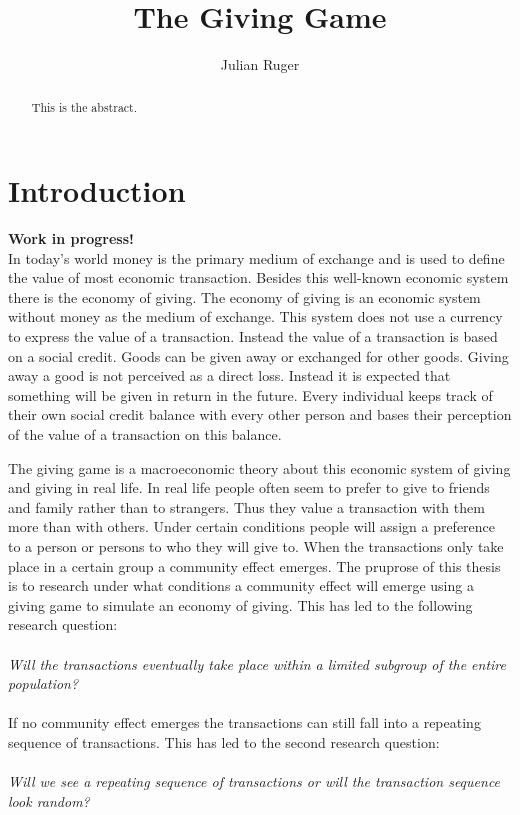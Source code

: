 \documentclass[twoside,openright]{uva-bachelor-thesis}
\title{The Giving Game}
\author{Julian Ruger}
\begin{document}
\maketitle

\begin{abstract}
This is the abstract. 
\end{abstract}

\tableofcontents

\chapter{Introduction}
\textbf{Work in progress!}
\\
In today's world money is the primary medium of exchange and is used to define the value of most economic transaction. Besides this well-known  economic system there is the economy of giving. The economy of giving is an economic  system without money as the medium of exchange. This system does not use a currency to express the value of a transaction. Instead the value of a transaction is based on a social credit. Goods can be given away or exchanged for other goods. Giving away a good is not perceived as a direct loss. Instead it is expected that something will be given in return in the future. Every individual keeps track of their own social credit balance with every other person and bases their perception of the value of a transaction on this balance. 

The giving game is a macroeconomic theory about this economic system of giving and giving in real life. In real life people often seem to prefer to give to friends and family rather than to strangers. Thus they value a transaction with them more than with others. Under certain conditions people will assign a preference to a person or persons to who they will give to. When the transactions only take place in a certain group a community effect emerges. The pruprose of this thesis is to research under what conditions a community effect will emerge using a giving game to simulate an economy of giving. This has led to the following research question:
\\
\\
\textit{Will the transactions eventually take place within a limited subgroup of the entire population?}
\\
\\
If no community effect emerges the transactions can still fall into a repeating sequence of transactions. This has led to the second research question:
\\
\\
\textit{Will we see a repeating sequence of transactions or will the transaction sequence look random?}
\end{document}
